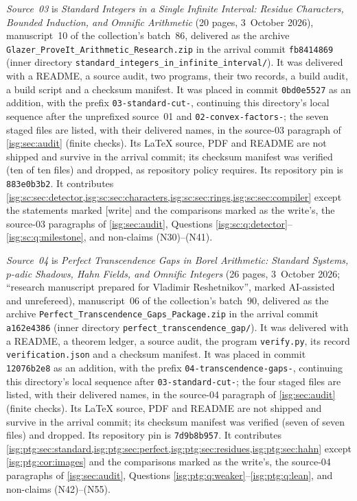 \documentclass[11pt]{article}
\theoremstyle{definition}
\theoremstyle{remark}
\newcommand{\fn}[1]{\nolinkurl{#1}}
\begin{document}
\emph{Source~03} is \emph{Standard Integers in a Single Infinite
Interval: Residue Characters, Bounded Induction, and Omnific Arithmetic}
(20 pages, 3~October 2026), manuscript~10 of the collection's batch~86,
delivered as the archive \fn{Glazer_ProveIt_Arithmetic_Research.zip} in
the arrival commit \texttt{fb8414869} (inner directory
\fn{standard_integers_in_infinite_interval/}). It was delivered with a
README, a source audit, two programs, their two records, a build audit,
a build script and a checksum manifest. It was placed in commit
\texttt{0bd0e5527} as an addition, with the prefix \fn{03-standard-cut-},
continuing this directory's local sequence after the unprefixed source~01
and \fn{02-convex-factors-}; the seven staged files are listed, with their
delivered names, in the source-03 paragraph of
\cref{isg:sec:audit} (finite checks). Its LaTeX source, PDF and
README are not shipped and survive in the arrival commit; its checksum
manifest was verified (ten of ten files) and dropped, as repository policy
requires. Its repository pin is \texttt{883e0b3b2}. It contributes
\cref{isg:sc:sec:detector,isg:sc:sec:characters,isg:sc:sec:rings,isg:sc:sec:compiler}
except the statements marked \textup{[write]} and the comparisons marked as
the write's, the source-03 paragraphs of \cref{isg:sec:audit}, Questions
\ref{isg:sc:q:detector}--\ref{isg:sc:q:milestone}, and non-claims
\textup{(N30)}--\textup{(N41)}.

\emph{Source~04} is \emph{Perfect Transcendence Gaps in Borel Arithmetic:
Standard Systems, $p$-adic Shadows, Hahn Fields, and Omnific Integers}
(26 pages, 3~October 2026; ``research manuscript prepared for Vladimir
Reshetnikov'', marked AI-assisted and unrefereed), manuscript~06 of the
collection's batch~90, delivered as the archive
\fn{Perfect_Transcendence_Gaps_Package.zip} in the arrival commit
\texttt{a162e4386} (inner directory \fn{perfect_transcendence_gap/}). It
was delivered with a README, a theorem ledger, a source audit, the program
\fn{verify.py}, its record \fn{verification.json} and a checksum manifest.
It was placed in commit \texttt{12076b2e8} as an addition, with the prefix
\fn{04-transcendence-gaps-}, continuing this directory's local sequence
after \fn{03-standard-cut-}; the four staged files are listed, with their
delivered names, in the source-04 paragraph of \cref{isg:sec:audit} (finite
checks). Its LaTeX source, PDF and README are not shipped and survive in
the arrival commit; its checksum manifest was verified (seven of seven
files) and dropped. Its repository pin is \texttt{7d9b8b957}. It
contributes
\cref{isg:ptg:sec:standard,isg:ptg:sec:perfect,isg:ptg:sec:residues,isg:ptg:sec:hahn}
except \cref{isg:ptg:cor:images} and the comparisons marked as the
write's, the source-04 paragraphs of \cref{isg:sec:audit}, Questions
\ref{isg:ptg:q:weaker}--\ref{isg:ptg:q:lean}, and non-claims
\textup{(N42)}--\textup{(N55)}.
\end{document}
